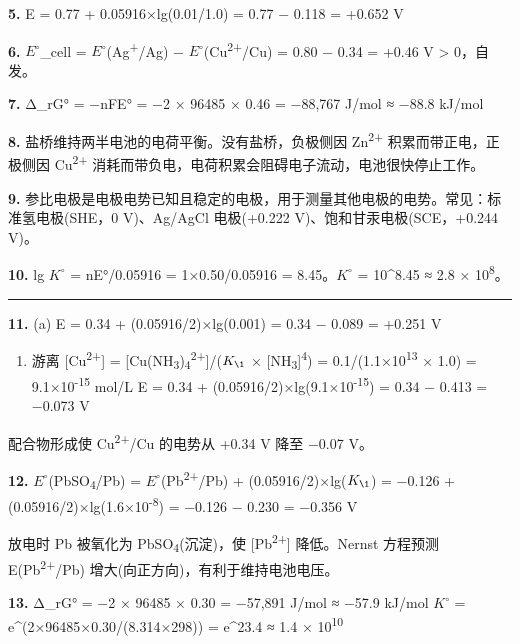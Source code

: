 \documentclass[a4paper,11pt]{ctexart}
\providecommand{\tightlist}{\setlength{\itemsep}{0pt}\setlength{\parskip}{0pt}}
\begin{document}
\textbf{5.} E = 0.77 + 0.05916×lg(0.01/1.0) = 0.77 − 0.118 = +0.652 V

\textbf{6.} \(E^{\circ}\)\_cell = \(E^{\circ}\)(Ag\textsuperscript{+}/Ag) − \(E^{\circ}\)(Cu\textsuperscript{2+}/Cu) = 0.80 − 0.34 = +0.46 V \textgreater{} 0，自发。

\textbf{7.} Δ\_rG° = −nFE° = −2 × 96485 × 0.46 = −88,767 J/mol ≈ −88.8 kJ/mol

\textbf{8.} 盐桥维持两半电池的电荷平衡。没有盐桥，负极侧因 Zn\textsuperscript{2+} 积累而带正电，正极侧因 Cu\textsuperscript{2+} 消耗而带负电，电荷积累会阻碍电子流动，电池很快停止工作。

\textbf{9.} 参比电极是电极电势已知且稳定的电极，用于测量其他电极的电势。常见：标准氢电极(SHE，0 V)、Ag/AgCl 电极(+0.222 V)、饱和甘汞电极(SCE，+0.244 V)。

\textbf{10.} lg \(K^{\circ}\) = nE°/0.05916 = 1×0.50/0.05916 = 8.45。\(K^{\circ}\) = 10\^{}8.45 ≈ 2.8 × 10\textsuperscript{8}。

\begin{center}\rule{0.5\linewidth}{0.5pt}\end{center}

\textbf{11.}
(a) E = 0.34 + (0.05916/2)×lg(0.001) = 0.34 − 0.089 = +0.251 V

\begin{enumerate}
\def\labelenumi{(\alph{enumi})}
\setcounter{enumi}{1}
\tightlist
\item
  游离 {[}Cu\textsuperscript{2+}{]} = {[}Cu(NH\textsubscript{3})\textsubscript{4}\textsuperscript{2+}{]}/(\(K_{\1}\) × {[}NH\textsubscript{3}{]}\textsuperscript{4}) = 0.1/(1.1×10\textsuperscript{13} × 1.0) = 9.1×10\textsuperscript{-15} mol/L
  E = 0.34 + (0.05916/2)×lg(9.1×10\textsuperscript{-15}) = 0.34 − 0.413 = −0.073 V
\end{enumerate}

配合物形成使 Cu\textsuperscript{2+}/Cu 的电势从 +0.34 V 降至 −0.07 V。

\textbf{12.} \(E^{\circ}\)(PbSO\textsubscript{4}/Pb) = \(E^{\circ}\)(Pb\textsuperscript{2+}/Pb) + (0.05916/2)×lg(\(K_{\1}\)) = −0.126 + (0.05916/2)×lg(1.6×10\textsuperscript{-8}) = −0.126 − 0.230 = −0.356 V

放电时 Pb 被氧化为 PbSO\textsubscript{4}(沉淀)，使 {[}Pb\textsuperscript{2+}{]} 降低。Nernst 方程预测 E(Pb\textsuperscript{2+}/Pb) 增大(向正方向)，有利于维持电池电压。

\textbf{13.} Δ\_rG° = −2 × 96485 × 0.30 = −57,891 J/mol ≈ −57.9 kJ/mol
\(K^{\circ}\) = e\^{}(2×96485×0.30/(8.314×298)) = e\^{}23.4 ≈ 1.4 × 10\textsuperscript{10}
\end{document}
